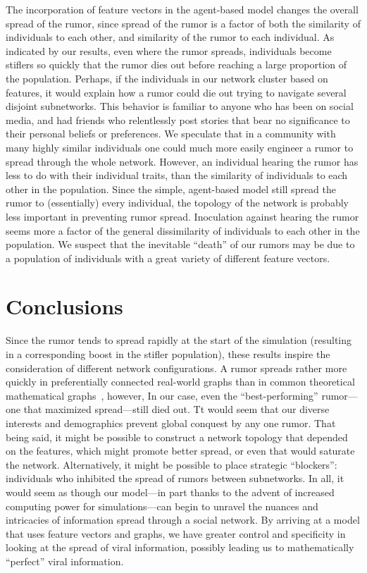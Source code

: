 The incorporation of feature vectors in the agent-based model changes the overall spread of the rumor, since spread of the rumor is a factor of both the similarity of individuals to each other, and similarity of the rumor to each individual.
As indicated by our results, even where the rumor spreads, individuals become stiflers so quickly that the rumor dies out before reaching a large proportion of the population.
Perhaps, if the individuals in our network cluster based on features, it would explain how a rumor could die out trying to navigate several disjoint subnetworks.
This behavior is familiar to anyone who has been on social media, and had friends who relentlessly post stories that bear no significance to their personal beliefs or preferences.
We speculate that in a community with many highly similar individuals one could much more easily engineer a rumor to spread through the whole network.
However, an individual hearing the rumor has less to do with their individual traits, than the similarity of individuals to each other in the population.
Since the simple, agent-based model still spread the rumor to (essentially) every individual, the topology of the network is probably less important in preventing rumor spread.
Inoculation against hearing the rumor seems more a factor of the general dissimilarity of individuals to each other in the population.
We suspect that the inevitable ``death'' of our rumors may be due to a population of individuals with a great variety of different feature vectors.

\section{Conclusions}
\label{sec:conclusions}
Since the rumor tends to spread rapidly at the start of the simulation (resulting in a corresponding boost in the stifler population), these results inspire the consideration of different network configurations.
A rumor spreads rather more quickly in preferentially connected real-world graphs than in common theoretical mathematical graphs~\cite{doerr-2012}, however, In our case, even the ``best-performing'' rumor---one that maximized spread---still died out.
Tt would seem that our diverse interests and demographics prevent global conquest by any one rumor.
That being said, it might be possible to construct a network topology that depended on the features, which might promote better spread, or even that would saturate the network.
Alternatively, it might be possible to place strategic ``blockers'': individuals who inhibited the spread of rumors between subnetworks.
In all, it would seem as though our model---in part thanks to the advent of increased computing power for simulations---can begin to unravel the nuances and intricacies of information spread through a social network.
By arriving at a model that uses feature vectors and graphs, we have greater control and specificity in looking at the spread of viral information, possibly leading us to mathematically ``perfect'' viral information.
